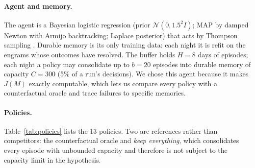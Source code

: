 \documentclass[11pt]{article}
\begin{document}
\paragraph{Agent and memory.} The agent is a Bayesian logistic regression (prior $\mathcal N(0,1.5^2 I)$; MAP by damped Newton with Armijo backtracking; Laplace posterior) that acts by Thompson sampling \citep{russo2018tutorial}. Durable memory is its only training data: each night it is refit on the engrams whose outcomes have resolved. The buffer holds $H=8$ days of episodes; each night a policy may consolidate up to $b=20$ episodes into durable memory of capacity $C=300$ (5\% of a run's decisions). We chose this agent because it makes $J(M)$ exactly computable, which lets us compare every policy with a counterfactual oracle and trace failures to specific memories.

\paragraph{Policies.} Table~\ref{tab:policies} lists the 13 policies. Two are references rather than competitors: the counterfactual oracle and \emph{keep everything}, which consolidates every episode with unbounded capacity and therefore is not subject to the capacity limit in the hypothesis.
\end{document}
